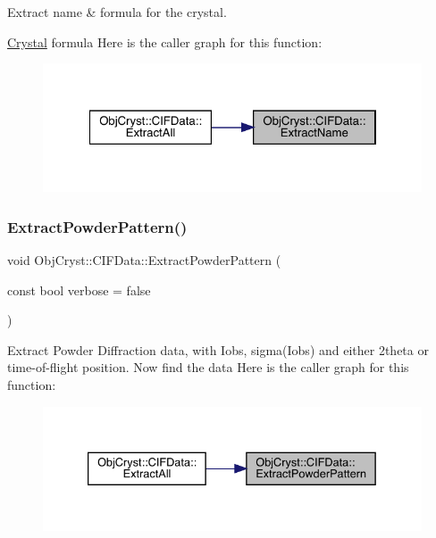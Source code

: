 Extract name \& formula for the crystal. 

\mbox{\hyperlink{class_obj_cryst_1_1_crystal}{Crystal}} formula Here is the caller graph for this function\+:
\nopagebreak
\begin{figure}[H]
\begin{center}
\leavevmode
\includegraphics[width=322pt]{class_obj_cryst_1_1_c_i_f_data_a57e9ec3f37cfe8c272cc102280f08d66_icgraph}
\end{center}
\end{figure}
\mbox{\label{class_obj_cryst_1_1_c_i_f_data_a10ae5869370e46547334730a1daabe5e}} 
\subsubsection{\texorpdfstring{ExtractPowderPattern()}{ExtractPowderPattern()}}
{\footnotesize\ttfamily void Obj\+Cryst\+::\+C\+I\+F\+Data\+::\+Extract\+Powder\+Pattern (\begin{DoxyParamCaption}\item[{const bool}]{verbose = {\ttfamily false} }\end{DoxyParamCaption})}

Extract Powder Diffraction data, with Iobs, sigma(\+Iobs) and either 2theta or time-\/of-\/flight position. Now find the data Here is the caller graph for this function\+:
\nopagebreak
\begin{figure}[H]
\begin{center}
\leavevmode
\includegraphics[width=333pt]{class_obj_cryst_1_1_c_i_f_data_a10ae5869370e46547334730a1daabe5e_icgraph}
\end{center}
\end{figure}
\mbox{\label{class_obj_cryst_1_1_c_i_f_data_aafcf8bbd95432172cca533d4a713729e}} 
